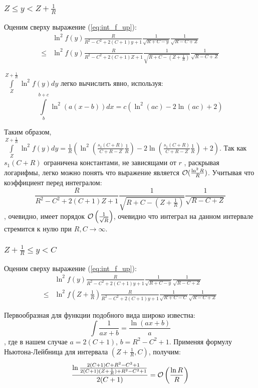 \subsubsection{$Z \le y < Z + \frac{1}{R}$}

Оценим сверху выражение (\ref{eq:int_f_up}):
\begin{align*}
       & \ln^2 f(y) \frac{R}{R^2 - C^2 + 2 (C + 1) y + 1} \frac{1}{\sqrt{R + C - y}} \frac{1}{\sqrt{R - C + Z}}
\\ \le & \ln^2 f(y) \frac{R}{R^2 - C^2 + 2 (C + 1) Z + 1} \frac{1}{\sqrt{R + C - (Z + \frac{1}{R})}} \frac{1}{\sqrt{R - C + Z}}
\end{align*}

$\int\limits_{Z}^{Z + \frac{1}{R}} \ln^2 f(y) dy$ легко вычислить явно, используя:
\[
    \int\limits_b^{b + c} \ln^2 (a (x - b)) dx = c (\ln^2(a c) - 2 \ln (a c) + 2)
\]

Таким образом, $\int\limits_{Z}^{Z + \frac{1}{R}} \ln^2 f(y) dy = \frac{1}{R} ( \ln^2 (\frac{s_1(C + R)}{C + R - Z} \frac{1}{R}) - 2 \ln (\frac{s_1(C + R)}{C + R - Z} \frac{1}{R}) + 2)$. Так как $s_1(C+R)$ ограничена константами, не зависящами от $r$ , раскрывая логарифмы, легко можно понять что выражение является $\mathcal{O}(\frac{\ln^2 R}{R})$. Учитывая что коэффициент перед интегралом:
\[
\frac{R}{R^2 - C^2 + 2 (C + 1) Z + 1} \frac{1}{\sqrt{R + C - (Z + \frac{1}{R})}} \frac{1}{\sqrt{R - C + Z}}
\]
, очевидно, имеет порядок $\mathcal{O}\left(\frac{1}{\sqrt{R}}\right)$, очевидно что интеграл на данном интервале стремится к нулю при $R, C \to \infty$.

\subsubsection{$Z + \frac{1}{R} \le y < C$}
Оценим сверху выражение (\ref{eq:int_f_up}):
\begin{align*}
       & \ln^2 f(y) \frac{R}{R^2 - C^2 + 2 (C + 1) y + 1} \frac{1}{\sqrt{R + C - y}} \frac{1}{\sqrt{R - C + Z}}
\\ \le & \ln^2 f(Z + \frac{1}{R}) \frac{R}{R^2 - C^2 + 2 (C + 1) y + 1} \frac{1}{\sqrt{R + C - C}} \frac{1}{\sqrt{R - C + Z}}
\end{align*}

Первообразная для функции подобного вида широко известна:
\[
\int \frac{1}{a x + b} = \frac{\ln (a x + b)}{a}
\]
, где в нашем случае $a = 2 (C + 1)$, $b = R^2 - C^2 + 1$. Применяя формулу Ньютона-Лейбница для интервала $(Z + \frac{1}{R}, C)$, получим:
\[
\frac{\ln \frac{2 (C + 1) C + R^2 - C^2 + 1}{2 (C + 1) (Z + \frac{1}{R}) + R^2 - C^2 + 1}}{2 (C + 1)} = \mathcal{O}\left( \frac{\ln R}{R} \right)
\]

